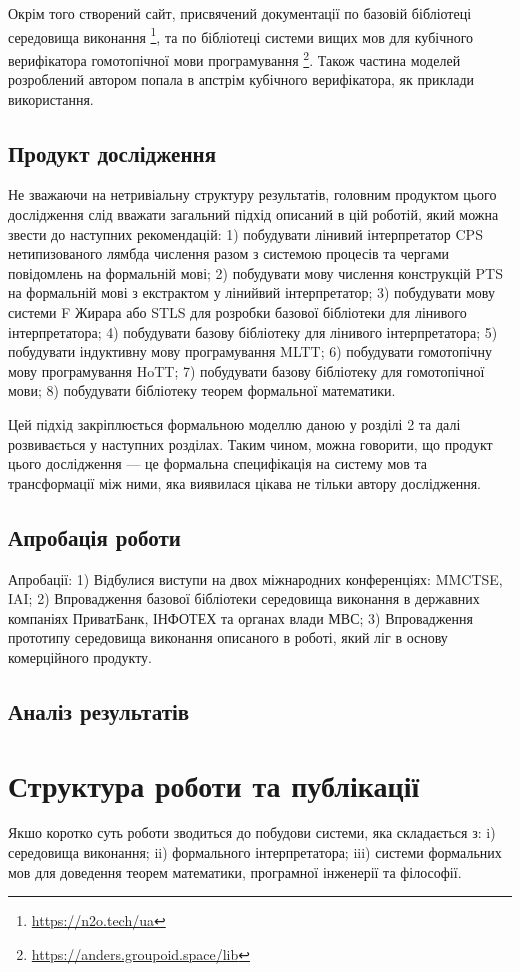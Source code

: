 Окрім того створений сайт, присвячений документації по базовій бібліотеці
середовища виконання \footnote{\url{https://n2o.tech/ua}},
та по бібліотеці системи вищих мов для кубічного верифікатора гомотопічної
мови програмування \footnote{\url{https://anders.groupoid.space/lib}}. Також частина
моделей розроблений автором попала в апстрім кубічного верифікатора,
як приклади використання.

\subsection{Продукт дослідження}
Не зважаючи на нетривіальну структуру результатів, головним продуктом цього
дослідження слід вважати загальний підхід описаний в цій роботій, який можна
звести до наступних рекомендацій:
1) побудувати лінивий інтерпретатор CPS нетипизованого лямбда числення разом
   з системою процесів та чергами повідомлень на формальній мові;
2) побудувати мову числення конструкцій PTS на формальній мові з екстрактом у лінийвий інтерпретатор;
3) побудувати мову системи F Жирара або STLS для розробки базової бібліотеки для лінивого інтерпретатора;
4) побудувати базову бібліотеку для лінивого інтерпретатора;
5) побудувати індуктивну мову програмування MLTT;
6) побудувати гомотопічну мову програмування HoTT;
7) побудувати базову бібліотеку для гомотопічної мови;
8) побудувати бібліотеку теорем формальної математики.

Цей підхід закріплюється формальною моделлю даною у розділі 2 та далі розвивається у наступних розділах.
Таким чином, можна говорити, що продукт цього дослідження --- це формальна специфікація на систему мов та
трансформації між ними, яка виявилася цікава не тільки автору дослідження.

\subsection{Апробація роботи}
Апробації:
1) Відбулися виступи на двох міжнародних конференціях: MMCTSE, IAI;
2) Впровадження базової бібліотеки середовища виконання в державних компаніях ПриватБанк,
   ІНФОТЕХ та органах влади МВС;
3) Впровадження прототипу середовища виконання описаного в роботі,
   який ліг в основу комерційного продукту.

\subsection{Аналіз результатів}

\newpage
\section{Структура роботи та публікації}
Якшо коротко суть роботи зводиться до побудови системи, яка складається з:
i) середовища виконання; ii) формального інтерпретатора; iii) системи формальних мов
для доведення теорем математики, програмної інженерії та філософії.

